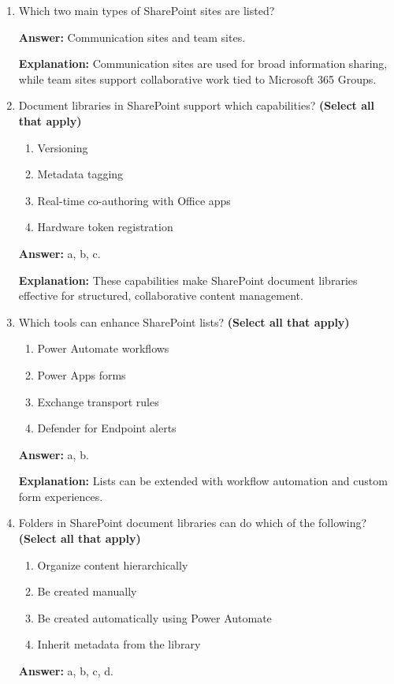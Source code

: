 \documentclass[10pt]{article}
\begin{document}
\begin{enumerate}[leftmargin=*]
\textbf{Answer:} True.

\textbf{Explanation:} SharePoint Online supports intranet publishing, document management, and process automation.

\item Which two main types of SharePoint sites are listed?

\textbf{Answer:} Communication sites and team sites.

\textbf{Explanation:} Communication sites are used for broad information sharing, while team sites support collaborative work tied to Microsoft 365 Groups.

\item Document libraries in SharePoint support which capabilities? \textbf{(Select all that apply)}
\begin{enumerate}[label=\alph*., leftmargin=1.5em]
\item Versioning
\item Metadata tagging
\item Real-time co-authoring with Office apps
\item Hardware token registration
\end{enumerate}
\textbf{Answer:} a, b, c.

\textbf{Explanation:} These capabilities make SharePoint document libraries effective for structured, collaborative content management.

\item Which tools can enhance SharePoint lists? \textbf{(Select all that apply)}
\begin{enumerate}[label=\alph*., leftmargin=1.5em]
\item Power Automate workflows
\item Power Apps forms
\item Exchange transport rules
\item Defender for Endpoint alerts
\end{enumerate}
\textbf{Answer:} a, b.

\textbf{Explanation:} Lists can be extended with workflow automation and custom form experiences.

\item Folders in SharePoint document libraries can do which of the following? \textbf{(Select all that apply)}
\begin{enumerate}[label=\alph*., leftmargin=1.5em]
\item Organize content hierarchically
\item Be created manually
\item Be created automatically using Power Automate
\item Inherit metadata from the library
\end{enumerate}
\textbf{Answer:} a, b, c, d.


\end{enumerate}
\end{document}
